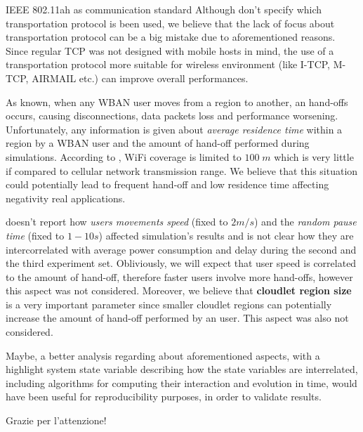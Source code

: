 \documentclass[10pt]{beamer}
\begin{document}
\begin{frame}{IEEE 802.11ah as communication standard}
Although \citet{MSAReport} don't specify which transportation protocol is been used, we believe that the lack of focus about transportation protocol can be a big mistake due to aforementioned reasons. Since regular TCP was not designed with mobile hosts in mind, the use of a transportation protocol more suitable for wireless environment (like I-TCP, M-TCP, AIRMAIL etc.) can improve overall performances.

As known, when any WBAN user moves from a region to another, an hand-offs occurs, causing disconnections, data packets loss and performance worsening. Unfortunately, any information is given about \textit{average residence time} within a region by a WBAN user and the amount of hand-off performed during simulations. According to \citet{MSAReport}, WiFi coverage is limited to $100\;m$ which is very little if compared to cellular network transmission range. We believe that this situation could potentially lead to frequent hand-off and low residence time affecting negativity real applications.

\citet{MSAReport} doesn't report how \textit{users movements speed} (fixed to $2 m/s$) and the \textit{random pause time} (fixed to $1-10 s$) affected simulation's results and is not clear how they are intercorrelated with average power consumption and delay during the second and the third experiment set. Obliviously, we will expect that user speed is correlated to the amount of hand-off, therefore faster users involve more hand-offs, however this aspect was not considered. Moreover, we believe that \textbf{cloudlet region size} is a very important parameter since smaller cloudlet regions can potentially increase the amount of hand-off performed by an user.\cite{tcp} This aspect was also not considered.

Maybe, a better analysis regarding about aforementioned aspects, with a highlight system state variable describing how the state variables are interrelated, including algorithms for computing their interaction and evolution in time, would have been useful for reproducibility purposes, in order to  validate \citet{MSAReport} results.


\end{frame}




\begin{frame}
  Grazie per l'attenzione!
\end{frame}

\end{document}
